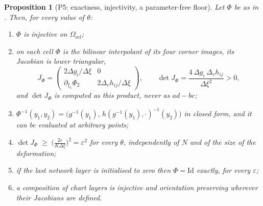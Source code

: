 \documentclass[11pt,a4paper]{article}
\theoremstyle{plain}
\newtheorem{proposition}[theorem]{Proposition}
\theoremstyle{definition}
\newcommand{\Id}{\mathrm{Id}}
\newcommand{\detJ}{\det J_\Phi}
\newcommand{\Om}{\Omega_{\mathrm{ref}}}
\begin{document}
\begin{proposition}[P5: exactness, injectivity, a parameter-free floor]
\label{prop:chart}
Let $\Phi$ be as in .  Then, for \emph{every} value of $\theta$:
\begin{enumerate}
\item[(i)] $\Phi$ is injective on $\Om$;
\item[(ii)] on each cell $\Phi$ is the bilinear interpolant of its four corner
  images, its Jacobian is lower triangular,
  \begin{equation}
    J_\Phi=\begin{pmatrix} 2\Delta g_i/\Delta\xi & 0\\[2pt]
    \partial_{\xi_1}\Phi_2 & 2\Delta_v h_{ij}/\Delta\xi\end{pmatrix},
    \qquad
    \detJ=\frac{4\,\Delta g_i\,\Delta_v h_{ij}}{\Delta\xi^{2}}>0,
  \end{equation}
  and $\detJ$ is computed as this product, never as $ad-bc$;
\item[(iii)] $\Phi^{-1}(y_1,y_2)=\big(g^{-1}(y_1),\,h(g^{-1}(y_1),\cdot)^{-1}(y_2)\big)$
  in closed form, and it can be evaluated at arbitrary points;
\item[(iv)] $\displaystyle \detJ \;\ge\; \Big(\frac{2\varepsilon}{K\Delta\xi}\Big)^{2}
  = \varepsilon^{2}$ for every $\theta$, independently of $N$ and of the size of
  the deformation;
\item[(v)] if the last network layer is initialised to zero then
  $\Phi=\Id$ exactly, for every $\varepsilon$;
\item[(vi)] a composition of chart layers is injective and orientation preserving
  wherever their Jacobians are defined.
\end{enumerate}
\end{proposition}
\end{document}
